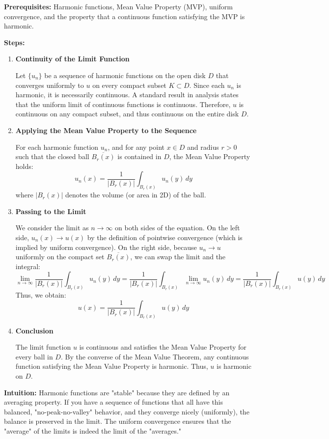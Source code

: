 \begin{solution}
\textbf{Prerequisites:} 
Harmonic functions, Mean Value Property (MVP), uniform convergence, and the property that a continuous function satisfying the MVP is harmonic.

\par\vspace{\baselineskip}
\textbf{Steps:}

\begin{enumerate}
    \item \textbf{Continuity of the Limit Function}

    Let $\{u_n\}$ be a sequence of harmonic functions on the open disk $D$ that converges uniformly to $u$ on every compact subset $K \subset D$. Since each $u_n$ is harmonic, it is necessarily continuous. A standard result in analysis states that the uniform limit of continuous functions is continuous. Therefore, $u$ is continuous on any compact subset, and thus continuous on the entire disk $D$.

    \item \textbf{Applying the Mean Value Property to the Sequence}

    For each harmonic function $u_n$, and for any point $x \in D$ and radius $r > 0$ such that the closed ball $\overline{B_r(x)}$ is contained in $D$, the Mean Value Property holds:
    \[
    u_n(x) = \frac{1}{|B_r(x)|} \int_{B_r(x)} u_n(y) \, dy
    \]
    where $|B_r(x)|$ denotes the volume (or area in 2D) of the ball.

    \item \textbf{Passing to the Limit}

    We consider the limit as $n \to \infty$ on both sides of the equation. On the left side, $u_n(x) \to u(x)$ by the definition of pointwise convergence (which is implied by uniform convergence). On the right side, because $u_n \to u$ uniformly on the compact set $\overline{B_r(x)}$, we can swap the limit and the integral:
    \[
    \lim_{n\to\infty} \frac{1}{|B_r(x)|} \int_{B_r(x)} u_n(y) \, dy = \frac{1}{|B_r(x)|} \int_{B_r(x)} \lim_{n\to\infty} u_n(y) \, dy = \frac{1}{|B_r(x)|} \int_{B_r(x)} u(y) \, dy
    \]
    Thus, we obtain:
    \[
    u(x) = \frac{1}{|B_r(x)|} \int_{B_r(x)} u(y) \, dy
    \]

    \item \textbf{Conclusion}

    The limit function $u$ is continuous and satisfies the Mean Value Property for every ball in $D$. By the converse of the Mean Value Theorem, any continuous function satisfying the Mean Value Property is harmonic. Thus, $u$ is harmonic on $D$.
\end{enumerate}

\par\vspace{\baselineskip}
\textbf{Intuition:} 
Harmonic functions are "stable" because they are defined by an averaging property. If you have a sequence of functions that all have this balanced, "no-peak-no-valley" behavior, and they converge nicely (uniformly), the balance is preserved in the limit. The uniform convergence ensures that the "average" of the limits is indeed the limit of the "averages."
\end{solution}


